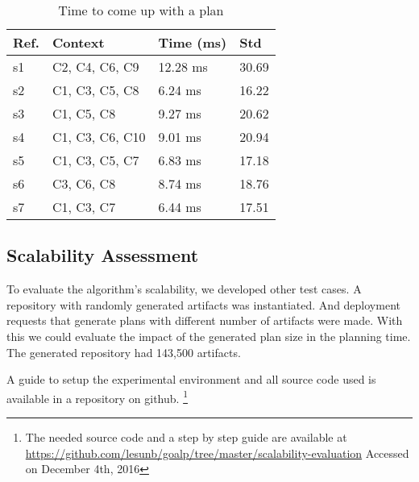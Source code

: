 \begin{table}[!htb]
\centering
\caption{Time to come up with a plan}
\begin{tabular}{|p{0.7cm}|p{3.75cm}|p{2cm}|p{2cm}|}
\hline
  Ref. &
  Context &
  Time (ms) &
  Std \\ \hline

s1 &
C2, C4, C6, C9 &
12.28 ms & 30.69 \\ \hline
s2 &
C1, C3, C5, C8 &
6.24 ms & 16.22 \\ \hline
s3 &
C1, C5, C8 &
9.27 ms & 20.62\\ \hline
s4 &
C1, C3, C6, C10 &
9.01 ms & 20.94 \\ \hline
s5 &
C1, C3, C5, C7 &
6.83 ms & 17.18 \\ \hline
s6 &
C3, C6, C8 &
8.74 ms & 18.76 \\ \hline
s7 &
C1, C3, C7  &
6.44 ms & 17.51 \\ \hline

\end{tabular}
\label{table:planning_time}
\end{table}


\subsection{Scalability Assessment}

To evaluate the algorithm's scalability, we developed other test cases.  A repository with randomly generated artifacts was instantiated. And deployment requests that generate plans with different number of artifacts were made. With this we could evaluate the impact of the generated plan size in the planning time.
The generated repository had 143,500 artifacts.

A guide to setup the experimental environment and all source code used is available in a repository on github.
\footnote{The needed source code and a step by step guide are available at
\url{https://github.com/lesunb/goalp/tree/master/scalability-evaluation} Accessed on December 4th, 2016}

